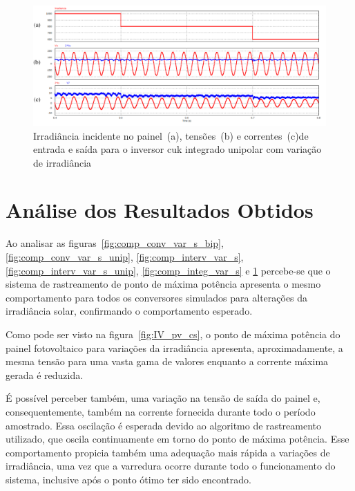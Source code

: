 \documentclass[
	12pt,				%
	openany,
	onseside,
	a4paper,			%
	english,			%
	french,				%
	spanish,			%
	brazil,				%
	]{abntex2}
\begin{document}
\begin{figure}[H]%
	\captionsetup{justification=centering}
	\centering
		\includegraphics[width= \linewidth]{comp_integ_var_s_unip}
		\caption{Irradiância incidente no painel~(a), tensões~(b) e correntes~(c)de entrada e saída para o inversor cuk integrado unipolar com variação de irradiância}
		\label{fig:comp_integ_var_s_unip}
\end{figure}


\chapter{Análise dos Resultados Obtidos}


Ao analisar as figuras~\ref{fig:comp_conv_var_s_bip}, \ref{fig:comp_conv_var_s_unip}, \ref{fig:comp_interv_var_s}, \ref{fig:comp_interv_var_s_unip}, \ref{fig:comp_integ_var_s} e \ref{fig:comp_integ_var_s_unip} percebe-se que o sistema de rastreamento de ponto de máxima potência apresenta o mesmo comportamento para todos os conversores simulados para alterações da irradiância solar, confirmando o comportamento esperado.

Como pode ser visto na figura~\ref{fig:IV_pv_cs}, o ponto de máxima potência do painel fotovoltaico para variações da irradiância apresenta, aproximadamente, a mesma tensão para uma vasta gama de valores enquanto a corrente máxima gerada é reduzida. 

É possível perceber também, uma variação na tensão de saída do painel e, consequentemente, também na corrente fornecida durante todo o período amostrado. Essa oscilação é esperada devido ao algoritmo de rastreamento utilizado, que oscila continuamente em torno do ponto de máxima potência. Esse comportamento propicia também uma adequação mais rápida a variações de irradiância, uma vez que a varredura ocorre durante todo o funcionamento do sistema, inclusive após o ponto ótimo ter sido encontrado.
\end{document}
